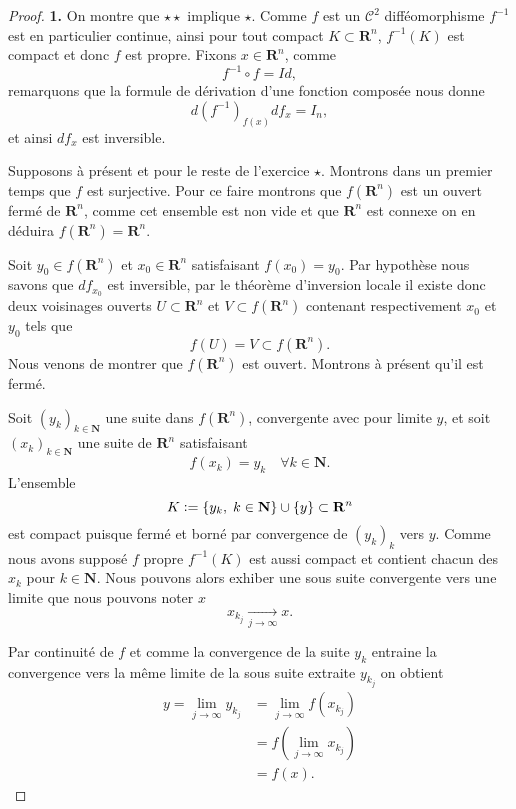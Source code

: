 \documentclass[12pt]{article}
\newcommand{\defeq}{\vcentcolon=}
\newcommand{\R}{\mathbf{R}}
\newcommand{\N}{\mathbf{N}}
\begin{document}
\begin{proof}
        \textbf{1.} On montre que $\star\star$ implique $\star$. Comme $f$ est un $\mathcal{C}^{2}$ difféomorphisme $f^{-1}$ est en particulier continue, ainsi pour tout compact $K \subset \R^{n}$, $f^{-1}(K)$ est compact et donc $f$ est propre. Fixons $x \in \R^{n}$, comme \[
                f^{-1}\circ f = Id
        ,\] remarquons que la formule de dérivation d'une fonction composée nous donne \[
        d(f^{-1})_{f(x)} df_{x} = I_{n}
,\] et ainsi $df_{x}$ est inversible. 

\medskip

Supposons à présent et pour le reste de l'exercice $\star$. Montrons dans un premier temps que $f$ est surjective. Pour ce faire montrons que $f(\R^{n})$ est un ouvert fermé de $\R^{n}$, comme cet ensemble est non vide et que $\R^{n}$ est connexe on en déduira $f(\R^{n}) = \R^{n}$.

Soit $y_0 \in f(\R^{n})$ et $x_0 \in \R^{n}$ satisfaisant $f(x_0) = y_0$. Par hypothèse nous savons que $df_{x_0}$ est inversible, par le théorème d'inversion locale il existe donc deux voisinages ouverts $U \subset \R^{n}$ et $V \subset f(\R^{n})$ contenant respectivement $x_0$ et $y_0$ tels que \[
        f(U) = V \subset f(\R^{n})
.\] Nous venons de montrer que $f(\R^{n})$ est ouvert. Montrons à présent qu'il est fermé.


Soit $(y_{k})_{k\in\N}$ une suite dans $f(\R^{n})$, convergente avec pour limite $y$, et soit $(x_{k})_{k\in\N}$ une suite de $\R^{n}$ satisfaisant \[
        f(x_{k}) = y_{k} \quad \forall k \in \N
.\] 
L'ensemble  \[
K \defeq \{y_{k}, \; k\in \N\} \cup \{y\} \subset \R^{n}
\] est compact puisque fermé et borné par convergence de $(y_{k})_{k}$ vers $y$. Comme nous avons supposé $f$ propre $f^{-1}(K)$  est aussi compact et contient chacun des $x_{k}$ pour $k \in \N$. Nous pouvons alors exhiber une sous suite convergente vers une limite que nous pouvons noter $x$  \[
x_{k_{j}} \underset{j\to\infty}{\longrightarrow} x
.\] 


Par continuité de $f$ et comme la convergence de la suite $y_{k}$ entraine la convergence vers la même limite de la sous suite extraite $y_{k_{j}}$ on obtient
\begin{align*}
        y = \lim_{j\to \infty}y_{k_{j}} &= \lim_{j\to \infty}f(x_{k_{j}}) \\
                                        &= f(\lim_{j\to \infty}x_{k_{j}}) \\
                                        &= f(x)
.\end{align*}


\end{proof}
\end{document}
